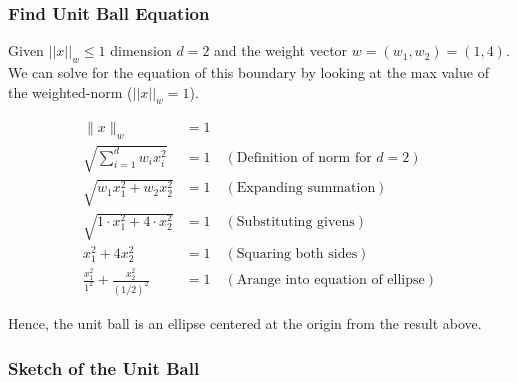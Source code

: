\documentclass{article}
\begin{document}
\subsubsection*{Find Unit Ball Equation}
\parbox{\textwidth}{
  Given $||x||_w \leq 1$ dimension $d=2$ and the weight vector $w=(w_1, w_2) = (1, 4)$. We can solve for the equation of this boundary by looking at the max value of the weighted-norm ($||x||_w = 1$).
}
\begin{align*}
    \|x\|_w &= 1 \\
    \sqrt{\sum_{i=1}^d w_i x_i^2} &= 1  \quad (\text{Definition of norm for } d = 2) \\
    \sqrt{w_1 x_1^2 + w_2 x_2^2} &= 1  \quad (\text{Expanding summation}) \\
    \sqrt{1 \cdot x_1^2 + 4 \cdot x_2^2} &= 1 \quad (\text{Substituting givens}) \\ 
    x_1^2 + 4x_2^2 &= 1 \quad (\text{Squaring both sides}) \\
    \frac{x_1^2}{1^2} + \frac{x_2^2}{(1/2)^2} &= 1 \quad (\text{Arange into equation of ellipse})
\end{align*}
\parbox{\textwidth}{
Hence, the unit ball is an ellipse centered at the origin from the result above.
}

\subsubsection*{Sketch of the Unit Ball}
\begin{figure}[h!]
\centering
{}
\end{figure}
\end{document}
